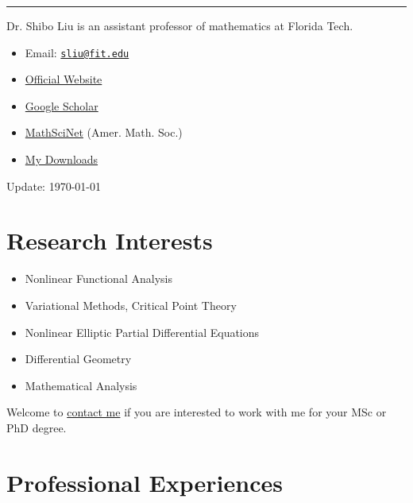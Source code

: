 \documentclass[12pt]{amsproc}
\begin{document}
\begin{multicols}{3}
\tableofcontents

\end{multicols}

\hrule

Dr. Shibo Liu is an assistant professor of mathematics at Florida Tech.

\begin{itemize}
\item Email:  \href{mailto:sliu@fit.edu}{\texttt{sliu@fit.edu}}
\item \href{https://www.fit.edu/faculty-profiles/l/liu-shibo/}{Official Website}
\item \href{https://scholar.google.com/citations?hl=en&user=yEjKTkIAAAAJ}{Google Scholar}
\item \href{https://mathscinet.ams.org/mathscinet/search/author.html?mrauthid=671940}{MathSciNet} (Amer. Math. Soc.)
\item \href{https://app.box.com/s/8w8596ssl2yvc5207fw9cjok6huv16gh}{My Downloads}
\end{itemize}

Update: \today

\dotfill

\section{Research Interests}
\begin{itemize}
\item Nonlinear Functional Analysis
\item Variational Methods, Critical Point Theory
\item Nonlinear Elliptic Partial Differential Equations
\item Differential Geometry
\item Mathematical Analysis
\end{itemize}

Welcome to \href{mailto:sliu@fit.edu}{contact me} if you are interested to work with me for your MSc or PhD degree. 

\section{Professional Experiences}
\end{document}
